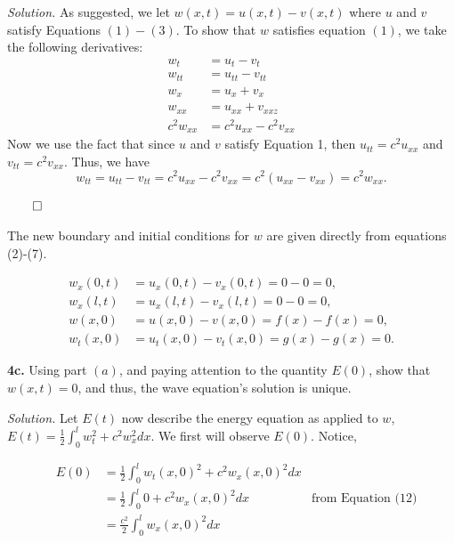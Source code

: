 \documentclass{article}
\begin{document}
\vspace{3mm} 
\textit{Solution.} As suggested, we let \(w(x,t)=u(x,t)-v(x,t)\) where \(u\) and \(v\) satisfy Equations \((1)-(3)\). To show that \( w\) satisfies equation \((1)\), we take the following derivatives:
\begin{align}
w_t &= u_t - v_t \\
w_{tt} &=u_{tt}-v_{tt} \\
w_x &= u_x + v_x \\
w_{xx} &= u_{xx} + v_{xxz} \\ 
c^2w_{xx} &= c^2u_{xx} - c^2v_{xx}
\end{align} 
Now we use the fact that since \(u \) and \(v\) satisfy Equation 1, then \(u_{tt}=c^2u_{xx}\) and \(v_{tt}=c^2v_{xx} \). Thus, we have 
\[
w_{tt} = u_{tt}-v_{tt} = c^2u_{xx}-c^2v_{xx} = c^2(u_{xx}-v_{xx} )= c^2w_{xx}.
\] 
\begin{flushright}
\( \qed \)
\end{flushright}

The new boundary and initial conditions for \(w\) are given directly from equations (2)-(7).

\begin{align}
w_x(0,t) &= u_x(0,t)-v_x(0,t) = 0 -0 = 0, \\
w_x(l,t) &= u_x(l,t)-v_x(l,t) = 0 -0 = 0, \\
w(x,0) &= u(x,0) - v(x,0)    = f(x) - f(x) =0,  \\
w_t(x,0) &= u_t(x,0) - v_t(x,0)  = g(x) - g(x) =0. 
\end{align}








\newpage
\textbf{4c.} Using part \((a)\), and paying attention to the quantity \(E(0)\), show that \(w(x,t)=0\), and thus, the wave equation's solution is unique. 

\vspace{3mm} 
\textit{Solution.} Let \(E(t) \) now describe the energy equation as applied to \(w\), \(E(t)=\frac{1}{2} \int_0^l w_t^2 + c^2w_x^2 dx\). We first will observe \(E(0)\). Notice, 

\begin{align*}
  & & E(0)&=\frac{1}{2} \int_0^l w_t(x,0)^2 + c^2w_x(x,0)^2 dx     &   &    \\
  & &     &=\frac{1}{2} \int_0^l 0+ c^2w_x(x,0)^2 dx       &\text{from Equation (12)} &    \\
  & &     &=   \frac{c^2}{2} \int_0^l w_x(x,0)^2 dx    &   &   
  \end{align*}
  
\end{document}

